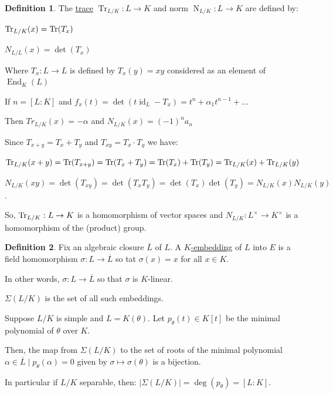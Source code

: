 \documentclass[openany]{amsbook}
\numberwithin{section}{chapter}
\theoremstyle{definition}
\newtheorem*{definition}{Definition}
\newcommand{\N}{\operatorname{N}}
\newcommand{\End}{\operatorname{End}}
\begin{document}
\begin{definition}
    The \underline{trace} \(\operatorname{Tr}_{L / K} : L \to K \) and norm \(\N_{L / K}: L \to K\) are defined by:
    
        \(\Tr_{L / K}(x) = \Tr(T_x)\) 
        
        \(N_{L / L}(x) = \det (T_x)\) 

    Where \(T_x : L \to L\) is defined by \(T_x(y) = xy\) considered as an element of \(\End_K(L)\) 
\end{definition}

If \(n = [L : K]\) and \(f_x(t) = \det (t \operatorname{id}_L - T_x) = t^n + \alpha_1 t^{n-1} + \dots \) 

Then \(Tr _{L / K}(x) = -\alpha\) and \(N_{L / K}(x) = (-1)^n a_n\) 

Since \(T_{x+y} = T_x + T_y\) and \(T_{xy} = T_x \cdot T_y\) we have:

\(\Tr_{L / K}(x + y) = \Tr(T_{x+y}) = \Tr(T_x + T_y) = \Tr(T_x)+\Tr(T_y)=\Tr_{L / K}(x)+\Tr_{L / K}(y)\) 

\(N_{L / K}(xy) = \det(T_{xy})=\det(T_x T_y)=\det(T_x)\det(T_y)=N_{L / K}(x) N_{L / K}(y)\).

So, \(\Tr_{L / K}:L \to K\) is a homomorphism of vector spaces and \(N_{L / K}:L^\times \to K^\times\) is a homomorphism of the (product) group.

\begin{definition}
    Fix an algebraic closure \(\overline{L} \) of \(L\). A \underline{\(K\)-embedding} of \(L\) into \(E\) is a field homomorphism \(\sigma : L \to \overline{L}\) so tat \(\sigma(x) = x\) for all \(x\in K\).

    In other words, \(\sigma : L \to \overline{L} \) so that \(\sigma\) is \(K\)-linear.

    \(\Sigma (L / K)\) is the set of all such embeddings.
\end{definition}

Suppose \(L / K\) is simple and \(L = K(\theta)\). Let \(p_\theta (t)\in K[t]\) be the minimal polynomial of \(\theta\) over \(K\).

Then, the map from \(\Sigma (L / K)\) to the set of roots of the minimal polynomial \(\alpha \in \overline{L} \mid p_\theta (\alpha) = 0\) given by \(\sigma \mapsto \sigma(\theta)\) is a bijection.

In particular if \(L / K\) separable, then: \(\vert \Sigma (L / K) \vert = \deg(p_{\theta})=[L : K]\).
\end{document}

